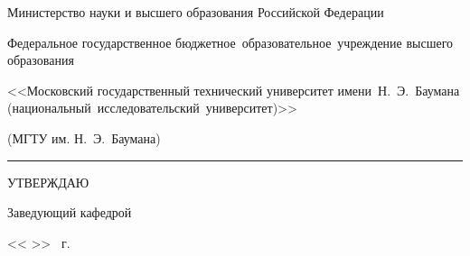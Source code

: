 

\fontsize{12pt}{12pt}\selectfont
\begin{center}
    {


        \begin{minipage}{0.99\textwidth}\centering\bfseries
            {
                \linespread{1}\selectfont
                {Министерство науки и высшего образования Российской Федерации}

                {Федеральное государственное бюджетное~образовательное~учреждение высшего образования}

                {<<Московский государственный технический университет имени~Н.~Э.~Баумана (национальный~исследовательский~университет)>>}

                {(МГТУ им. Н.~Э.~Баумана)}
            }
        \end{minipage}
    }

    \vspace{0.2cm}

    \rule{\linewidth}{3.4pt}
\end{center}

\fontsize{11pt}{11pt}\selectfont
\begin{flushright}
    \begin{minipage}{0.4\textwidth}\raggedleft

        УТВЕРЖДАЮ \hspace{2.5cm}

        Заведующий кафедрой~

        \vspace{0.3cm}

        \ulinetext{}{} 

        \vspace{0.3cm}

        << \ulinetext[1cm]{}{} >> \ulinetext{}{} \the\year \ г.
    \end{minipage}
\end{flushright}

